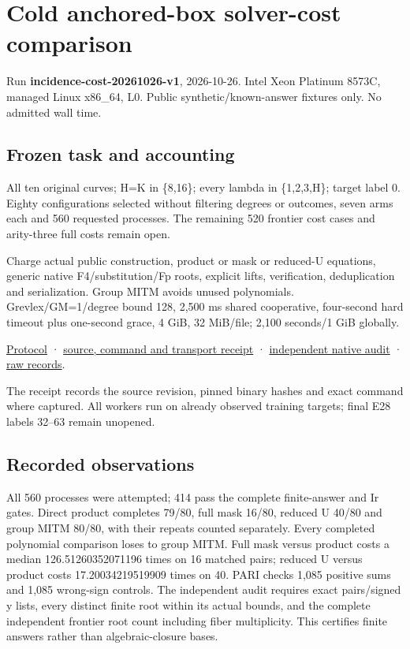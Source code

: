 \documentclass[
  10pt,
]{article}
\author{}
\date{}
\begin{document}
\section{Cold anchored-box solver-cost
comparison}\label{cold-anchored-box-solver-cost-comparison}

Run \textbf{incidence-cost-20261026-v1}, 2026-10-26. Intel Xeon Platinum
8573C, managed Linux x86\_64, L0. Public synthetic/known-answer fixtures
only. No admitted wall time.

\subsection{Frozen task and
accounting}\label{frozen-task-and-accounting}

All ten original curves; H=K in \{8,16\}; every lambda in \{1,2,3,H\};
target label 0. Eighty configurations selected without filtering degrees
or outcomes, seven arms each and 560 requested processes. The remaining
520 frontier cost cases and arity-three full costs remain open.

Charge actual public construction, product or mask or reduced-U
equations, generic native F4/substitution/Fp roots, explicit lifts,
verification, deduplication and serialization. Group MITM avoids unused
polynomials. Grevlex/GM=1/degree bound 128, 2,500 ms shared cooperative,
four-second hard timeout plus one-second grace, 4 GiB, 32 MiB/file;
2,100 seconds/1 GiB globally.

\href{../../../execution-v3/INCIDENCE_COST_PROTOCOL_V1.md}{Protocol} ·
\href{../../../execution-v3/runs/incidence-cost-20261026-v1.transport.json}{source,
command and transport receipt} ·
\href{../../../execution-v3/incidence-cost-audit-20261026-v1/AUDIT.json}{independent
native audit} ·
\href{../../../execution-v3/runs/incidence-cost-20261026-v1/RECORDS.json}{raw
records}.

The receipt records the source revision, pinned binary hashes and exact
command where captured. All workers run on already observed training
targets; final E28 labels 32--63 remain unopened.

\subsection{Recorded observations}\label{recorded-observations}

All 560 processes were attempted; 414 pass the complete finite-answer
and Ir gates. Direct product completes 79/80, full mask 16/80, reduced U
40/80 and group MITM 80/80, with their repeats counted separately. Every
completed polynomial comparison loses to group MITM. Full mask versus
product costs a median 126.51260352071196 times on 16 matched pairs;
reduced U versus product costs 17.20034219519909 times on 40. PARI
checks 1,085 positive sums and 1,085 wrong-sign controls. The
independent audit requires exact pairs/signed y lists, every distinct
finite root within its actual bounds, and the complete independent
frontier root count including fiber multiplicity. This certifies finite
answers rather than algebraic-closure bases.
\end{document}
